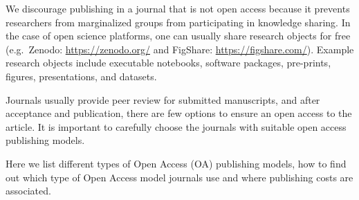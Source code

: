 \documentclass[
  letterpaper,
  DIV=11,
  numbers=noendperiod]{scrreport}
\begin{document}
We discourage publishing in a journal that is not open access because it
prevents researchers from marginalized groups from participating in
knowledge sharing. In the case of open science platforms, one can
usually share research objects for free (e.g.~Zenodo:
\url{https://zenodo.org/} and FigShare: \url{https://figshare.com/}).
Example research objects include executable notebooks, software
packages, pre-prints, figures, presentations, and datasets.

Journals usually provide peer review for submitted manuscripts, and
after acceptance and publication, there are few options to ensure an
open access to the article. It is important to carefully choose the
journals with suitable open access publishing models.

Here we list different types of Open Access (OA) publishing models, how
to find out which type of Open Access model journals use and where
publishing costs are associated.
\end{document}
